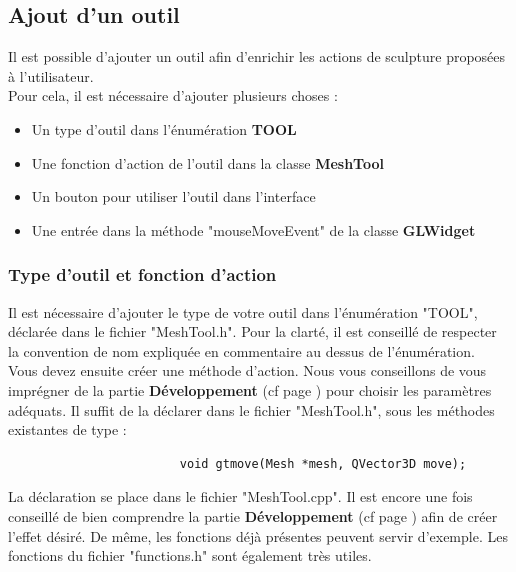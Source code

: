 \documentclass[a4paper]{memoir}
\begin{document}
			\subsection{Ajout d'un outil}
				Il est possible d'ajouter un outil afin d'enrichir les actions de sculpture proposées à l'utilisateur.\\
				Pour cela, il est nécessaire d'ajouter plusieurs choses :
				\begin{itemize}
					\item Un type d'outil dans l'énumération \textbf{TOOL}
					\item Une fonction d'action de l'outil dans la classe \textbf{MeshTool}
					\item Un bouton pour utiliser l'outil dans l'interface
					\item Une entrée dans la méthode "mouseMoveEvent" de la classe \textbf{GLWidget}
				\end{itemize}
				
				\subsubsection{Type d'outil et fonction d'action}
					Il est nécessaire d'ajouter le type de votre outil dans l'énumération "TOOL", déclarée dans le fichier "MeshTool.h". Pour la clarté, il 
					est conseillé de respecter la convention de nom expliquée en commentaire au dessus de l'énumération.\\
					Vous devez ensuite créer une méthode d'action. Nous vous conseillons de vous imprégner de la partie \textbf{Développement} (cf page 
					\pageref{tool-dev}) pour choisir les paramètres adéquats. Il suffit de la déclarer dans le fichier "MeshTool.h", sous les méthodes 
					existantes de type :
					\begin{verbatim}
						void gtmove(Mesh *mesh, QVector3D move);
					\end{verbatim}
					La déclaration se place dans le fichier "MeshTool.cpp". Il est encore une fois conseillé de bien comprendre la partie 
					\textbf{Développement} (cf page \pageref{tool-dev}) afin de créer l'effet désiré. De même, les fonctions déjà présentes peuvent servir 
					d'exemple. Les fonctions du fichier "functions.h" sont également très utiles.
					
\end{document}
